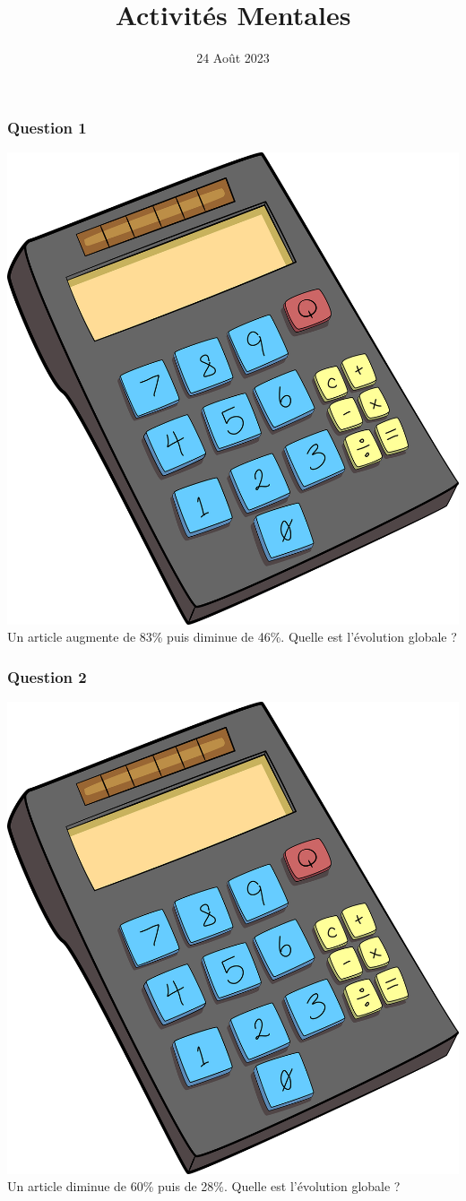 \documentclass[15pt, mathserif]{beamer}
\title{Activités Mentales}
\date{24 Août 2023}
\begin{document}
\begin{frame}
    \titlepage
\end{frame}

\begin{frame} 
	\frametitle{Question 1}
\includegraphics[scale=0.01]{calculatrice} Un article augmente de 83\% puis diminue de 46\%. Quelle est l'évolution globale ?\end{frame}


\begin{frame} 
	\frametitle{Question 2}
\includegraphics[scale=0.01]{calculatrice} Un article diminue de 60\% puis de 28\%. Quelle est l'évolution globale ?\end{frame}
\end{document}
